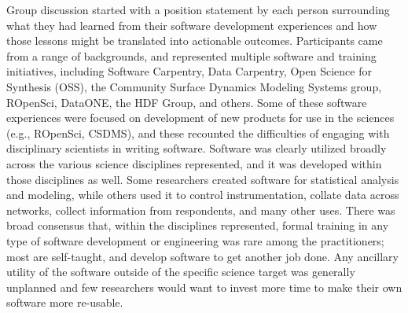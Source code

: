 \documentclass[11pt, oneside]{amsart}
\begin{document}
Group discussion started with a position statement by each person surrounding
what they had learned from their software development experiences and how those
lessons might be translated into actionable outcomes. Participants came from a
range of backgrounds, and represented multiple software and training
initiatives, including Software Carpentry, Data Carpentry, Open Science for
Synthesis (OSS), the Community Surface Dynamics Modeling Systems group, ROpenSci,
DataONE, the HDF Group, and others. Some of these software experiences were
focused on development of new products for use in the sciences (e.g., ROpenSci,
CSDMS), and these recounted the difficulties of engaging with disciplinary
scientists in writing software. Software was clearly utilized broadly across the
various science disciplines represented, and it was developed within those
disciplines as well. Some researchers created software for statistical analysis
and modeling, while others used it to control instrumentation, collate data
across networks, collect information from respondents, and many other uses.
There was broad consensus that, within the disciplines represented, formal
training in any type of software development or engineering was rare among the
practitioners; most are self-taught, and develop software to get another job
done. Any ancillary utility of the software outside of the specific science
target was generally unplanned and few researchers would want to invest more
time to make their own software more re-usable.
\end{document}
